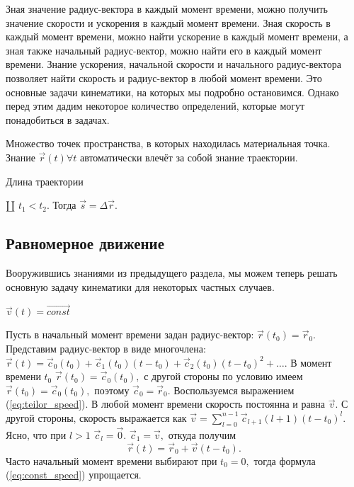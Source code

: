 Зная значение радиус-вектора в каждый момент времени, можно получить значение скорости
и ускорения в каждый момент времени. Зная скорость в каждый момент времени, можно
найти ускорение в каждый момент времени, а зная также начальный радиус-вектор, можно найти
его в каждый момент времени. Знание ускорения, начальной скорости и начального радиус-вектора
позволяет найти скорость и радиус-вектор в любой момент времени. Это основные задачи
кинематики, на которых мы подробно остановимся. Однако перед этим дадим некоторое количество
определений, которые могут понадобиться в задачах.
\begin{definition}[Траектория]
Множество точек пространства, в которых находилась материальная точка.
Знание $\vec{r}(t) \forall t$ автоматически влечёт за собой знание
траектории.
\end{definition}
\begin{definition}
Длина траектории
\end{definition}
\begin{definition}[Перемещение]
$\amalg$ $t_1 < t_2.$ Тогда $\vec{s} = \Delta {\vec{r}}.$
\end{definition}
\subsection{Равномерное движение}
Вооружившись знаниями из предыдущего раздела, мы можем теперь решать основную задачу кинематики
для некоторых частных случаев.
\begin{definition} $\vec{v}(t) = \overrightarrow{const}$\end{definition}
Пусть в начальный момент времени задан радиус-вектор: $\vec{r}(t_0) = \vec{r}_0$.
Представим радиус-вектор в виде многочлена:
$\vec{r}(t) = \vec{c}_0(t_0) +\vec{c}_1(t_0) (t-t_0) + \vec{c}_2(t_0) (t-t_0)^2+\ldots.$
В момент времени $t_0$ $\vec{r}(t_0) = \vec{c}_0(t_0),$ с другой стороны по условию имеем
$\vec{r}(t_0) = \vec{c}_0 (t_0),$ поэтому $\vec{c}_0 = \vec{r}_0.$
Воспользуемся выражением (\ref{eq:teilor_speed}). В любой момент времени
скорость постоянна и равна $\vec{v}.$ С другой стороны, скорость выражается как
$\vec{v} = \sum\limits_{l=0}^{n-1}\vec{c}_{l+1}(l+1)(t-t_0)^{l}.$ Ясно, что
при $l>1$ $\vec{c}_l = \vec{0}.$ $\vec{c}_1=\vec{v},$ откуда получим
\begin{equation}
\vec{r} (t) = \vec{r}_0 + \vec{v}(t-t_0).
\label{eq:const_speed}
\end{equation}
Часто начальный момент времени выбирают при $t_0 = 0,$ тогда
формула (\ref{eq:const_speed}) упрощается.
